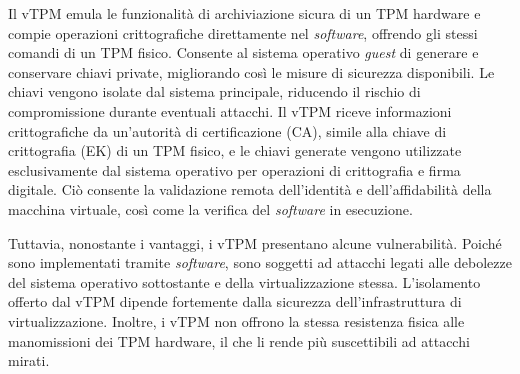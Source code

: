 Il vTPM emula le funzionalità di archiviazione sicura di un TPM hardware e compie operazioni crittografiche direttamente nel \textit{software}, offrendo gli stessi comandi di un TPM fisico. Consente al sistema operativo \textit{guest} di generare e conservare chiavi private, migliorando così le misure di sicurezza disponibili. Le chiavi vengono isolate dal sistema principale, riducendo il rischio di compromissione durante eventuali attacchi. Il vTPM riceve informazioni crittografiche da un'autorità di certificazione (CA), simile alla chiave di crittografia (EK) di un TPM fisico, e le chiavi generate vengono utilizzate esclusivamente dal sistema operativo per operazioni di crittografia e firma digitale. Ciò consente la validazione remota dell'identità e dell'affidabilità della macchina virtuale, così come la verifica del \textit{software} in esecuzione.

Tuttavia, nonostante i vantaggi, i vTPM presentano alcune vulnerabilità. Poiché sono implementati tramite \textit{software}, sono soggetti ad attacchi legati alle debolezze del sistema operativo sottostante e della virtualizzazione stessa. L'isolamento offerto dal vTPM dipende fortemente dalla sicurezza dell'infrastruttura di virtualizzazione. Inoltre, i vTPM non offrono la stessa resistenza fisica alle manomissioni dei TPM hardware, il che li rende più suscettibili ad attacchi mirati.